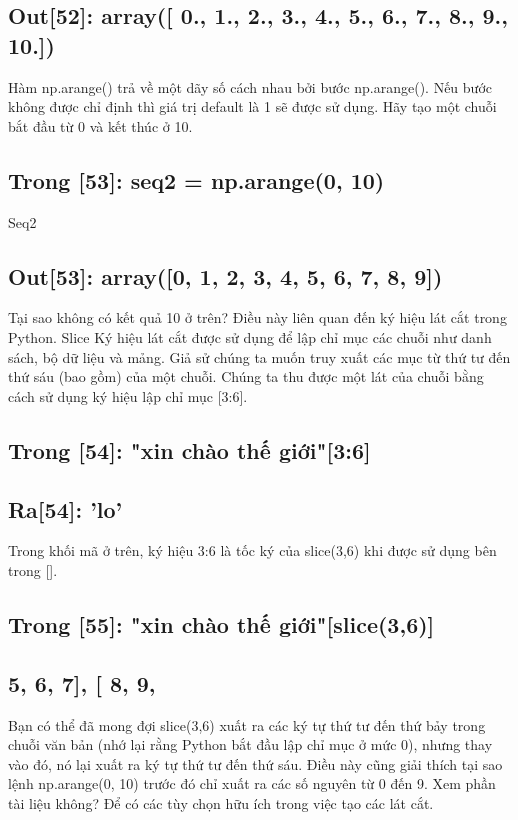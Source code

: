 \subsection{Out[52]: array([ 0., 1., 2., 3., 4., 5., 6., 7., 8., 9., 10.])}

Hàm np.arange() trả về một dãy số cách nhau bởi bước np.arange(). Nếu bước không được chỉ định thì giá trị default là 1 sẽ được sử dụng. Hãy tạo một chuỗi bắt đầu từ 0 và kết thúc ở 10.

\subsection{Trong [53]: seq2 = np.arange(0, 10)}

Seq2

\subsection{Out[53]: array([0, 1, 2, 3, 4, 5, 6, 7, 8, 9])}

Tại sao không có kết quả 10 ở trên? Điều này liên quan đến ký hiệu lát cắt trong Python. Slice Ký hiệu lát cắt được sử dụng để lập chỉ mục các chuỗi như danh sách, bộ dữ liệu và mảng. Giả sử chúng ta muốn truy xuất các mục từ thứ tư đến thứ sáu (bao gồm) của một chuỗi. Chúng ta thu được một lát của chuỗi bằng cách sử dụng ký hiệu lập chỉ mục [3:6].

\subsection{Trong [54]: "xin chào thế giới"[3:6]}

\subsection{Ra[54]: 'lo'}

Trong khối mã ở trên, ký hiệu 3:6 là tốc ký của slice(3,6) khi được sử dụng bên trong [].

\subsection{Trong [55]: "xin chào thế giới"[slice(3,6)]}

\subsection{5, 6, 7], [ 8, 9,}

Bạn có thể đã mong đợi slice(3,6) xuất ra các ký tự thứ tư đến thứ bảy trong chuỗi văn bản (nhớ lại rằng Python bắt đầu lập chỉ mục ở mức 0), nhưng thay vào đó, nó lại xuất ra ký tự thứ tư đến thứ sáu. Điều này cũng giải thích tại sao lệnh np.arange(0, 10) trước đó chỉ xuất ra các số nguyên từ 0 đến 9. Xem phần tài liệu không? Để có các tùy chọn hữu ích trong việc tạo các lát cắt.

